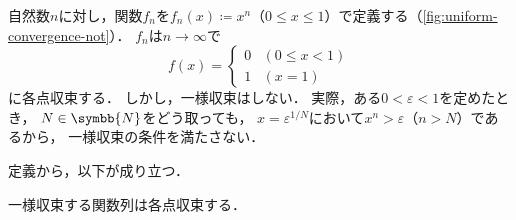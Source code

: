 \documentclass[../sotsu.tex]{subfiles}
\begin{document}
\begin{example}
    自然数$n$に対し，関数$f_n$を$f_n (x) \coloneq x^n$（$0 \leq x \leq 1$）で定義する（\cref{fig:uniform-convergence-not}）．
    $f_n$は$n \to \infty$で
    \begin{equation*}
        f (x) = 
        \begin{cases}
            0  &  (0 \leq x < 1)  \\
            1  &  (x = 1)
        \end{cases}
    \end{equation*}
    に各点収束する．
    しかし，一様収束はしない．
    実際，ある$0 < \varepsilon < 1$を定めたとき，
    $N \in \symbb{N}$をどう取っても，
    $x = \varepsilon^{1/N}$において$x^n > \varepsilon$（$n > N$）であるから，
    一様収束の条件を満たさない．
\end{example}


定義から，以下が成り立つ．

\begin{proposition}
    一様収束する関数列は各点収束する．
\end{proposition}
\end{document}
